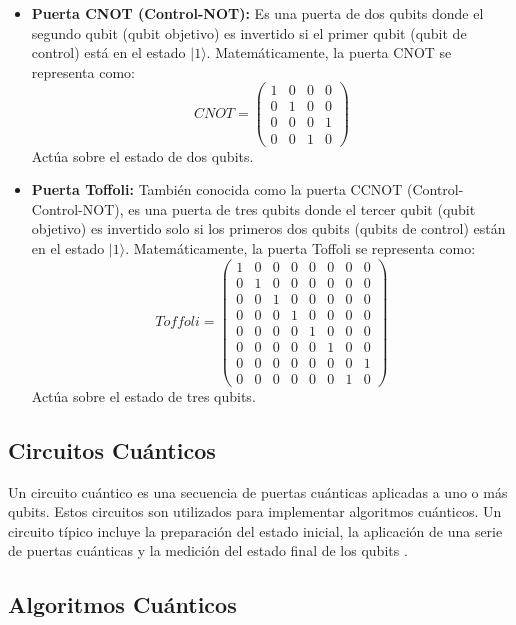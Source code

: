 \documentclass[11pt,a4paper,spanish]{book}
\begin{document}
\begin{itemize}
	\item \textbf{Puerta CNOT (Control-NOT):} Es una puerta de dos qubits donde el segundo qubit (qubit objetivo) es invertido si el primer qubit (qubit de control) está en el estado \(\lvert 1 \rangle\). Matemáticamente, la puerta CNOT se representa como:
	\[
	CNOT = \begin{pmatrix}
		1 & 0 & 0 & 0 \\
		0 & 1 & 0 & 0 \\
		0 & 0 & 0 & 1 \\
		0 & 0 & 1 & 0
	\end{pmatrix}
	\]
	Actúa sobre el estado de dos qubits.
	
	\item \textbf{Puerta Toffoli:} También conocida como la puerta CCNOT (Control-Control-NOT), es una puerta de tres qubits donde el tercer qubit (qubit objetivo) es invertido solo si los primeros dos qubits (qubits de control) están en el estado \(\lvert 1 \rangle\). Matemáticamente, la puerta Toffoli se representa como:
	\[
	Toffoli = \begin{pmatrix}
		1 & 0 & 0 & 0 & 0 & 0 & 0 & 0 \\
		0 & 1 & 0 & 0 & 0 & 0 & 0 & 0 \\
		0 & 0 & 1 & 0 & 0 & 0 & 0 & 0 \\
		0 & 0 & 0 & 1 & 0 & 0 & 0 & 0 \\
		0 & 0 & 0 & 0 & 1 & 0 & 0 & 0 \\
		0 & 0 & 0 & 0 & 0 & 1 & 0 & 0 \\
		0 & 0 & 0 & 0 & 0 & 0 & 0 & 1 \\
		0 & 0 & 0 & 0 & 0 & 0 & 1 & 0
	\end{pmatrix}
	\]
	Actúa sobre el estado de tres qubits.
	
\end{itemize}

\subsection{Circuitos Cuánticos}

Un circuito cuántico es una secuencia de puertas cuánticas aplicadas a uno o más qubits. Estos circuitos son utilizados para implementar algoritmos cuánticos. Un circuito típico incluye la preparación del estado inicial, la aplicación de una serie de puertas cuánticas y la medición del estado final de los qubits \cite{nielsenChuang}.

\subsection{Algoritmos Cuánticos}
\end{document}
